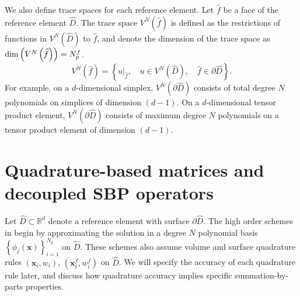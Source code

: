 \documentclass[review]{siamart0216}
\theoremstyle{assumption}
\renewcommand{\hat}[1]{\hat{#1}}
\newcommand{\LRp}[1]{\left( #1 \right)}
\newcommand{\LRc}[1]{\left\{ #1 \right\}}
\renewcommand{\hat}{\widehat}
\newcommand{\note}[1]{{\color{blue}{#1}}}
\begin{document}
We also define trace spaces for each reference element.  Let $\hat{f}$ be a face of the reference element $\hat{D}$.  The trace space $V^N \LRp{\hat{f}}$ is defined as the restrictions of functions in $V^N\LRp{\hat{D}}$ to $\hat{f}$, and denote the dimension of the trace space as ${\rm dim}\LRp{V^N\LRp{{\hat{f}}}} = N^f_p$.  
\[
V^N \LRp{\hat{f}} = \LRc{ \left.u\right|_{\hat{f}}, \quad u \in V^N\LRp{\hat{D}}, \quad \hat{f}\in \partial\hat{D}}.
\]
For example, on a $d$-dimensional simplex, $V^N \LRp{\partial \hat{D}}$ consists of total degree $N$ polynomials on simplices of dimension $(d-1)$.  On a $d$-dimensional tensor product element, $V^N \LRp{\partial \hat{D}}$ consists of maximum degree $N$ polynomials on a tensor product element of dimension $(d-1)$.  




\section{Quadrature-based matrices and decoupled SBP operators}
\label{sec:sbp}
Let $\hat{D} \subset\mathbb{R}^d$ denote a reference element with surface $\partial \hat{D}$.  
The high order schemes in \cite{chan2017discretely, chan2018discretely} begin by approximating the solution in a degree $N$ polynomial basis $\LRc{\phi_j({\bm{x}})}_{i=1}^{N_p}$ on $\hat{D}$.  These schemes also assume volume and surface quadrature rules $({\bm{x}}_i, w_i)$, $\LRp{{\bm{x}}^f_i,w^f_i}$ on $\hat{D}$.  We will specify the accuracy of each quadrature rule later, and discuss how quadrature accuracy implies specific summation-by-parts properties.  
\end{document}
